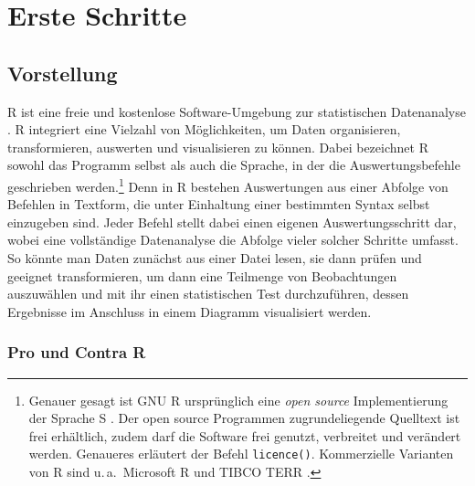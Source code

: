 \chapter{Erste Schritte}
\label{sec:firstSteps}

\section{Vorstellung}
\label{sec:intro}

R ist eine freie und kostenlose Software-Umgebung zur statistischen Datenanalyse \cite{Ihaka1996, RDevelopmentCoreTeam2008c}. R integriert eine Vielzahl von Möglichkeiten, um Daten organisieren, transformieren, auswerten und visualisieren zu können. Dabei bezeichnet R sowohl das Programm selbst als auch die Sprache, in der die Auswertungsbefehle geschrieben werden.\footnote{Genauer gesagt ist GNU R ursprünglich eine \emph{open source} Implementierung der Sprache S \cite{Becker1988}. Der open source Programmen zugrundeliegende Quelltext ist frei erhältlich, zudem darf die Software frei genutzt, verbreitet und verändert werden. Genaueres erläutert der Befehl \lstinline!licence()!. Kommerzielle Varianten von R sind u.\,a.\ Microsoft R \cite{Revolution2014} und TIBCO TERR \cite{TIBCOSoftwareInc2008}.} Denn in R bestehen Auswertungen aus einer Abfolge von Befehlen in Textform, die unter Einhaltung einer bestimmten Syntax selbst einzugeben sind. Jeder Befehl stellt dabei einen eigenen Auswertungsschritt dar, wobei eine vollständige Datenanalyse die Abfolge vieler solcher Schritte umfasst. So könnte man Daten zunächst aus einer Datei lesen, sie dann prüfen und geeignet transformieren, um dann eine Teilmenge von Beobachtungen auszuwählen und mit ihr einen statistischen Test durchzuführen, dessen Ergebnisse im Anschluss in einem Diagramm visualisiert werden.

\subsection{Pro und Contra R}

